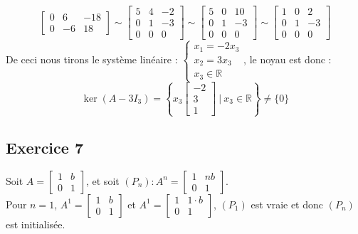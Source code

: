 \documentclass{article}
\newcommand{\R}{\mathbb{R}}
\begin{document}
\begin{enumerate}
$$\begin{bmatrix}
    0 & 6 & -18 \\ 
    0 & -6 & 18 
    \end{bmatrix} \sim
    \begin{bmatrix} 
    5 & 4 & -2 \\ 
    0 & 1 & -3 \\ 
    0 & 0 & 0 
    \end{bmatrix} \sim 
    \begin{bmatrix} 
    5 & 0 & 10 \\ 
    0 & 1 & -3 \\ 
    0 & 0 & 0 
    \end{bmatrix} \sim
    \begin{bmatrix} 
    1 & 0 & 2 \\ 
    0 & 1 & -3 \\ 
    0 & 0 & 0 
    \end{bmatrix}$$
    De ceci nous tirons le système linéaire :
    $\begin{cases}
    x_1 = -2x_3 \\
    x_2 = 3x_3\\
    x_3 \in \R
    \end{cases}$, le noyau est donc : $$\ker (A-3I_3) = \left\{ x_3\begin{bmatrix}
    -2 \\ 3 \\ 1
    \end{bmatrix} \ | \  x_3 \in \R \right\} \neq \{0\}$$
\end{enumerate}

\subsection*{Exercice 7}
\noindent Soit $A = \begin{bmatrix}
1 & b \\ 0 & 1 \end{bmatrix}$, et soit $(P_n): A^n = \begin{bmatrix} 1 & nb \\ 0 & 1 \end{bmatrix}$. \\
Pour $n=1$, $A^1 = \begin{bmatrix} 1 & b \\ 0 & 1 \end{bmatrix}$ et $A^1 = \begin{bmatrix} 1 & 1\cdot b \\ 0 & 1 \end{bmatrix}$, $(P_1)$ est vraie et donc $(P_n)$ est initialisée. \\
\end{document}
